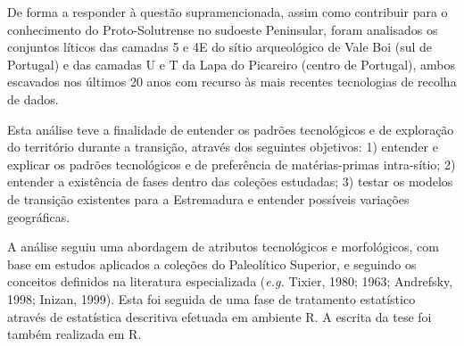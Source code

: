 \documentclass[12pt,twoside]{reedthesis}
\begin{document}
\begin{resumo}
    De forma a responder à questão supramencionada, assim como contribuir para o conhecimento do Proto-Solutrense no sudoeste Peninsular, foram analisados os conjuntos líticos das camadas 5 e 4E do sítio arqueológico de Vale Boi (sul de Portugal) e das camadas U e T da Lapa do Picareiro (centro de Portugal), ambos escavados nos últimos 20 anos com recurso às mais recentes tecnologias de recolha de dados.
    
    Esta análise teve a finalidade de entender os padrões tecnológicos e de exploração do território durante a transição, através dos seguintes objetivos: 1) entender e explicar os padrões tecnológicos e de preferência de matérias-primas intra-sítio; 2) entender a existência de fases dentro das coleções estudadas; 3) testar os modelos de transição existentes para a Estremadura e entender possíveis variações geográficas.
    
    A análise seguiu uma abordagem de atributos tecnológicos e morfológicos, com base em estudos aplicados a coleções do Paleolítico Superior, e seguindo os conceitos definidos na literatura especializada (\emph{e.g.} Tixier, 1980; 1963; Andrefsky, 1998; Inizan, 1999). Esta foi seguida de uma fase de tratamento estatístico através de estatística descritiva efetuada em ambiente R. A escrita da tese foi também realizada em R.
    

\end{resumo}
\end{document}
